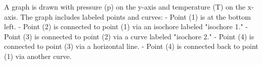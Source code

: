 A graph is drawn with pressure (p) on the y-axis and temperature (T) on the x-axis. The graph includes labeled points and curves:  
- Point (1) is at the bottom left.  
- Point (2) is connected to point (1) via an isochore labeled "isochore 1."  
- Point (3) is connected to point (2) via a curve labeled "isochore 2."  
- Point (4) is connected to point (3) via a horizontal line.  
- Point (4) is connected back to point (1) via another curve.